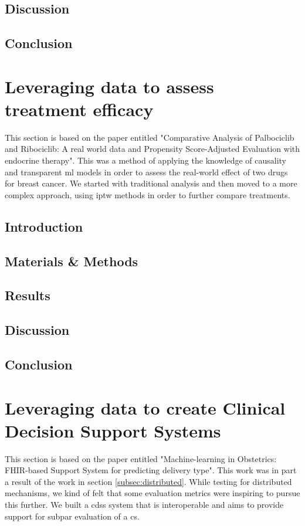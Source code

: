 \subsection{Discussion}

\subsection{Conclusion}





\section{Leveraging data to assess treatment efficacy}\label{subsec:ipop}
This section is based on the paper entitled "Comparative Analysis of Palbociclib and Ribociclib: A real world data and Propensity Score-Adjusted Evaluation with endocrine therapy". This was a method of applying the knowledge of causality and transparent \ac{ml} models in order to assess the real-world effect of two drugs for breast cancer. We started with traditional analysis and then moved to a more complex approach, using \ac{iptw} methods in order to further compare treatments.


\subsection{Introduction}

\subsection{Materials \& Methods}

\subsection{Results}

\subsection{Discussion}

\subsection{Conclusion}



\section{Leveraging data to create Clinical Decision Support Systems}\label{subsec:obs}
This section is based on the paper entitled "Machine-learning in Obstetrics: FHIR-based Support System for predicting delivery type". This work was in part a result of the work in section \ref{subsec:distributed}. While testing for distributed mechanisms, we kind of felt that some evaluation metrics were inspiring to pursue this further. We built a \ac{cdss} system that is interoperable and aims to provide support for subpar evaluation of a \ac{cs}.

